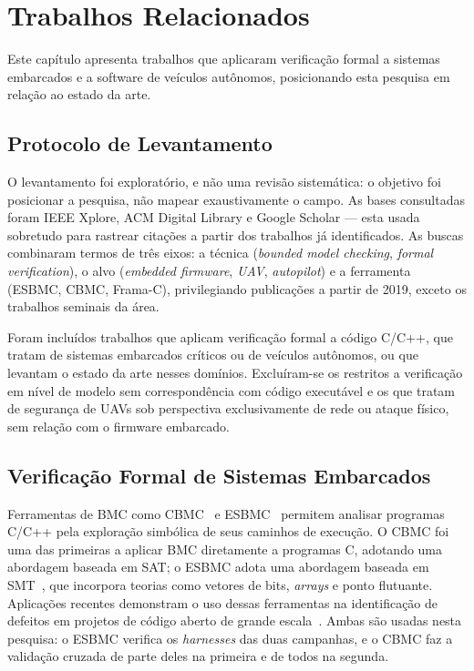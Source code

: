 \chapter{Trabalhos Relacionados}
\label{cap:relacionados}

Este capítulo apresenta trabalhos que aplicaram verificação formal a sistemas
embarcados e a software de veículos autônomos, posicionando esta pesquisa em
relação ao estado da arte.

\section{Protocolo de Levantamento}
\label{sec:rel-protocolo}

O levantamento foi exploratório, e não uma revisão sistemática: o objetivo foi
posicionar a pesquisa, não mapear exaustivamente o campo. As bases consultadas
foram IEEE Xplore, ACM Digital Library e Google Scholar --- esta usada sobretudo
para rastrear citações a partir dos trabalhos já identificados. As buscas
combinaram termos de três eixos: a técnica (\textit{bounded model checking},
\textit{formal verification}), o alvo (\textit{embedded firmware}, \textit{UAV},
\textit{autopilot}) e a ferramenta (ESBMC, CBMC, Frama-C), privilegiando
publicações a partir de 2019, exceto os trabalhos seminais da área.

Foram incluídos trabalhos que aplicam verificação formal a código C/C++, que
tratam de sistemas embarcados críticos ou de veículos autônomos, ou que levantam
o estado da arte nesses domínios. Excluíram-se os restritos a verificação em
nível de modelo sem correspondência com código executável e os que tratam de
segurança de UAVs sob perspectiva exclusivamente de rede ou ataque físico, sem
relação com o firmware embarcado.

\section{Verificação Formal de Sistemas Embarcados}
\label{sec:rel-embarcados}

Ferramentas de BMC como CBMC~\cite{Kroening2014} e ESBMC~\cite{Cordeiro2012}
permitem analisar programas C/C++ pela exploração simbólica de seus caminhos de
execução. O CBMC foi uma das primeiras a aplicar BMC diretamente a programas C,
adotando uma abordagem baseada em SAT; o ESBMC adota uma abordagem baseada em
SMT~\cite{Cordeiro2012}, que incorpora teorias como vetores de bits,
\textit{arrays} e ponto flutuante. Aplicações recentes demonstram o uso dessas
ferramentas na identificação de defeitos em projetos de código aberto de grande
escala~\cite{Sousa2026}. Ambas são usadas nesta pesquisa: o ESBMC verifica
os \textit{harnesses} das duas campanhas, e o CBMC faz a validação cruzada de parte deles na
primeira e de todos na segunda.

